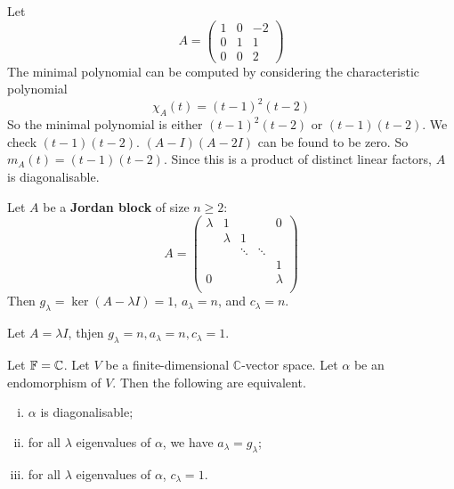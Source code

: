 \documentclass[a4paper,11pt]{article}
\begin{document}
\begin{example}
	Let
	\[
		A = \begin{pmatrix}
			1 & 0 & -2 \\
			0 & 1 & 1  \\
			0 & 0 & 2
		\end{pmatrix}
	\]
	The minimal polynomial can be computed by considering the characteristic polynomial
	\[
		\chi_A(t) = (t-1)^2(t-2)
	\]
	So the minimal polynomial is either \( (t-1)^2(t-2) \) or \( (t-1)(t-2) \).
	We check \( (t-1)(t-2) \).
	\( (A - I)(A - 2I) \) can be found to be zero.
	So \( m_A(t) = (t-1)(t-2) \).
	Since this is a product of distinct linear factors, \( A \) is diagonalisable.
\end{example}

\begin{example}
	Let \( A \) be a \textbf{Jordan block} of size \( n \geq 2 \): 
	\[
		A = \begin{pmatrix}
			\lambda & 1 &  &  &  0 \\
			 & \lambda & 1  &  &   \\
			 &  & \ddots & \ddots &   \\
			 &  &  &  & 1  \\
			0 &  &  &  &  \lambda \\
		\end{pmatrix}
	\]
	Then \( g_\lambda = \ker(A-\lambda I) =1 \), \( a_\lambda = n \), and \( c_\lambda = n \).
\end{example}

\begin{example}
	Let $ A = \lambda I $, thjen $ g_\lambda = n, a_\lambda = n, c_\lambda = 1 $. 
\end{example}

\begin{lemma}
	Let \( {\mathbb{F}} = \mathbb C \).
	Let \( V \) be a finite-dimensional \( \mathbb C \)-vector space.
	Let \( \alpha \) be an endomorphism of \( V \).
	Then the following are equivalent.
	\begin{enumerate}[(i)]
		\item \( \alpha \) is diagonalisable;
		\item for all \( \lambda \) eigenvalues of \( \alpha \), we have \( a_\lambda = g_\lambda \);
		\item for all \( \lambda \) eigenvalues of \( \alpha \), \( c_\lambda = 1 \).
	\end{enumerate}
\end{lemma}
\end{document}
